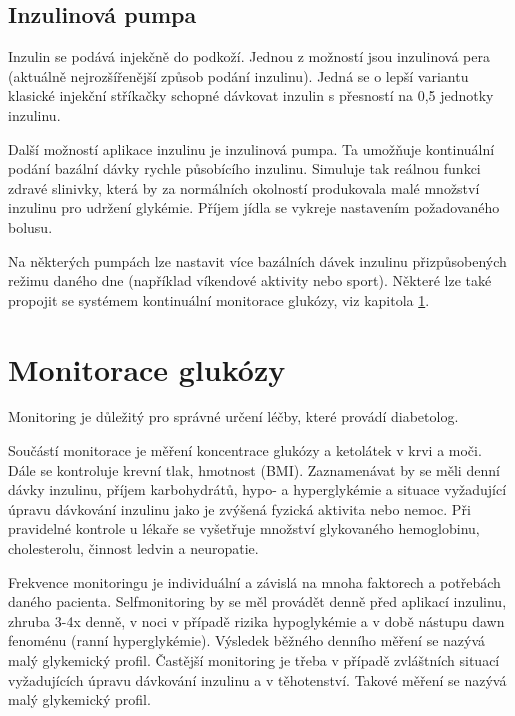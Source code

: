 \subsection{Inzulinová pumpa}
\label{ch:pumpa}

Inzulin se podává injekčně do podkoží. Jednou z možností jsou inzulinová pera (aktuálně nejrozšířenější způsob podání inzulinu). Jedná se o lepší variantu klasické injekční stříkačky schopné dávkovat inzulin s přesností na 0,5 jednotky inzulinu.

Další možností aplikace inzulinu je inzulinová pumpa. Ta umožňuje kontinuální podání bazální dávky rychle působícího inzulinu. Simuluje tak reálnou funkci zdravé slinivky, která by za normálních okolností produkovala malé množství inzulinu pro udržení glykémie. Příjem jídla se vykreje nastavením požadovaného bolusu.

Na některých pumpách lze nastavit více bazálních dávek inzulinu přizpůsobených režimu daného dne (například víkendové aktivity nebo sport). Některé lze také propojit se systémem kontinuální monitorace glukózy, viz kapitola \ref{ch:monitorace}. \cite{Diabetes.Perusicova,Diabetes.Rybka} 


\section{Monitorace glukózy}
\label{ch:monitorace}

Monitoring je důležitý pro správné určení léčby, které provádí diabetolog.

Součástí monitorace je měření koncentrace glukózy a ketolátek v krvi a moči. Dále se kontroluje krevní tlak, hmotnost (BMI). Zaznamenávat by se měli denní dávky inzulinu, příjem karbohydrátů, hypo- a hyperglykémie a situace vyžadující úpravu dávkování inzulinu jako je zvýšená fyzická aktivita nebo nemoc. Při pravidelné kontrole u lékaře se vyšetřuje množství glykovaného hemoglobinu, cholesterolu, činnost ledvin a neuropatie.

Frekvence monitoringu je individuální a závislá na mnoha faktorech a potřebách daného pacienta. Selfmonitoring by se měl provádět denně před aplikací inzulinu, zhruba 3-4x denně, v noci v případě rizika hypoglykémie a v době nástupu dawn fenoménu (ranní hyperglykémie). Výsledek běžného denního měření se nazývá malý glykemický profil. Častější monitoring je třeba v případě zvláštních situací vyžadujících úpravu dávkování inzulinu a v těhotenství. Takové měření se nazývá malý glykemický profil.

